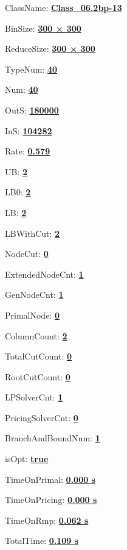 \documentclass[11pt]{article}
\begin{document}
\pagestyle{empty}


ClassName: \underline{\textbf{Class_06.2bp-13}}
\par
BinSize: \underline{\textbf{300 × 300}}
\par
ReduceSize: \underline{\textbf{300 × 300}}
\par
TypeNum: \underline{\textbf{40}}
\par
Num: \underline{\textbf{40}}
\par
OutS: \underline{\textbf{180000}}
\par
InS: \underline{\textbf{104282}}
\par
Rate: \underline{\textbf{0.579}}
\par
UB: \underline{\textbf{2}}
\par
LB0: \underline{\textbf{2}}
\par
LB: \underline{\textbf{2}}
\par
LBWithCut: \underline{\textbf{2}}
\par
NodeCut: \underline{\textbf{0}}
\par
ExtendedNodeCnt: \underline{\textbf{1}}
\par
GenNodeCnt: \underline{\textbf{1}}
\par
PrimalNode: \underline{\textbf{0}}
\par
ColumnCount: \underline{\textbf{2}}
\par
TotalCutCount: \underline{\textbf{0}}
\par
RootCutCount: \underline{\textbf{0}}
\par
LPSolverCnt: \underline{\textbf{1}}
\par
PricingSolverCnt: \underline{\textbf{0}}
\par
BranchAndBoundNum: \underline{\textbf{1}}
\par
isOpt: \underline{\textbf{true}}
\par
TimeOnPrimal: \underline{\textbf{0.000 s}}
\par
TimeOnPricing: \underline{\textbf{0.000 s}}
\par
TimeOnRmp: \underline{\textbf{0.062 s}}
\par
TotalTime: \underline{\textbf{0.109 s}}
\par
\newpage
\end{document}
